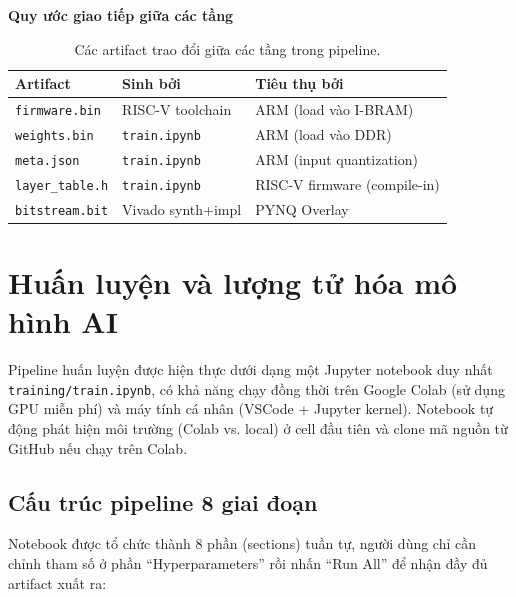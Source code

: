 \textbf{Quy ước giao tiếp giữa các tầng}
\begin{table}[!h]
    \centering
    \caption{Các artifact trao đổi giữa các tầng trong pipeline.}
    \label{tab:artifacts}
    \begin{tabular}{|l|l|l|}
        \hline
        \textbf{Artifact} & \textbf{Sinh bởi} & \textbf{Tiêu thụ bởi} \\
        \hline
        \texttt{firmware.bin}    & RISC-V toolchain      & ARM (load vào I-BRAM)         \\
        \texttt{weights.bin}     & \texttt{train.ipynb}  & ARM (load vào DDR)            \\
        \texttt{meta.json}       & \texttt{train.ipynb}  & ARM (input quantization)      \\
        \texttt{layer\_table.h}  & \texttt{train.ipynb}  & RISC-V firmware (compile-in)  \\
        \texttt{bitstream.bit}   & Vivado synth+impl     & PYNQ Overlay                  \\
        \hline
    \end{tabular}
\end{table}

\newpage
\section{Huấn luyện và lượng tử hóa mô hình AI}
\label{sec:training_impl}

Pipeline huấn luyện được hiện thực dưới dạng một Jupyter notebook duy nhất \texttt{training/train.ipynb}, có khả năng chạy đồng thời trên Google Colab (sử dụng GPU miễn phí) và máy tính cá nhân (VSCode + Jupyter kernel). Notebook tự động phát hiện môi trường (Colab vs. local) ở cell đầu tiên và clone mã nguồn từ GitHub nếu chạy trên Colab.

\subsection{Cấu trúc pipeline 8 giai đoạn}
Notebook được tổ chức thành 8 phần (sections) tuần tự, người dùng chỉ cần chỉnh tham số ở phần ``Hyperparameters'' rồi nhấn ``Run All'' để nhận đầy đủ artifact xuất ra:


